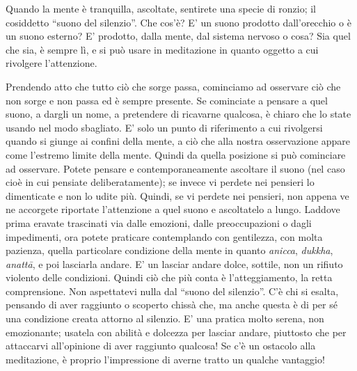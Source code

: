 
Quando la mente è tranquilla, ascoltate, sentirete una specie di ronzio;
il cosiddetto ``suono del silenzio''. Che cos'è? E' un suono prodotto
dall'orecchio o è un suono esterno? E' prodotto, dalla mente, dal
sistema nervoso o cosa? Sia quel che sia, è sempre lì, e si può usare in
meditazione in quanto oggetto a cui rivolgere l'attenzione.

Prendendo atto che tutto ciò che sorge passa, cominciamo ad osservare
ciò che non sorge e non passa ed è sempre presente. Se cominciate a
pensare a quel suono, a dargli un nome, a pretendere di ricavarne
qualcosa, è chiaro che lo state usando nel modo sbagliato. E' solo un
punto di riferimento a cui rivolgersi quando si giunge ai confini della
mente, a ciò che alla nostra osservazione appare come l'estremo limite
della mente. Quindi da quella posizione si può cominciare ad osservare.
Potete pensare e contemporaneamente ascoltare il suono (nel caso cioè in
cui pensiate deliberatamente); se invece vi perdete nei pensieri lo
dimenticate e non lo udite più. Quindi, se vi perdete nei pensieri, non
appena ve ne accorgete riportate l'attenzione a quel suono e ascoltatelo
a lungo. Laddove prima eravate trascinati via dalle emozioni, dalle
preoccupazioni o dagli impedimenti, ora potete praticare contemplando
con gentilezza, con molta pazienza, quella particolare condizione della
mente in quanto \textit{anicca}, \textit{dukkha}, \textit{anattā}, e poi lasciarla andare. E' un
lasciar andare dolce, sottile, non un rifiuto violento delle condizioni.
Quindi ciò che più conta è l'atteggiamento, la retta comprensione. Non
aspettatevi nulla dal ``suono del silenzio''. C'è chi si esalta, pensando
di aver raggiunto o scoperto chissà che, ma anche questa è di per sé una
condizione creata attorno al silenzio. E' una pratica molto serena, non
emozionante; usatela con abilità e dolcezza per lasciar andare,
piuttosto che per attaccarvi all'opinione di aver raggiunto qualcosa! Se
c'è un ostacolo alla meditazione, è proprio l'impressione di averne
tratto un qualche vantaggio!

